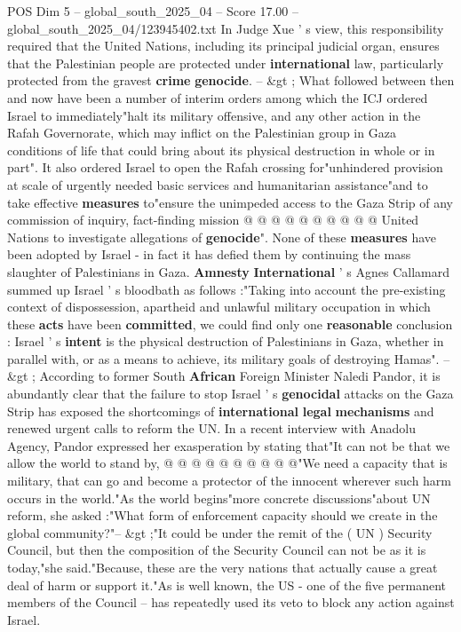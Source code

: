 \begin{textsample}{POS Dim 5 – global\_south\_2025\_04 – Score 17.00 – global\_south\_2025\_04/123945402.txt}
In Judge Xue ' s view, this responsibility required that the United Nations, including its principal judicial organ, ensures that the Palestinian people are protected under \textbf{international} law, particularly protected from the gravest \textbf{crime} \textbf{genocide}. -- \&gt ; What followed between then and now have been a number of interim orders among which the ICJ ordered Israel to immediately"halt its military offensive, and any other action in the Rafah Governorate, which may inflict on the Palestinian group in Gaza conditions of life that could bring about its physical destruction in whole or in part".
It also ordered Israel to open the Rafah crossing for"unhindered provision at scale of urgently needed basic services and humanitarian assistance"and to take effective \textbf{measures} to"ensure the unimpeded access to the Gaza Strip of any commission of inquiry, fact-finding mission @ @ @ @ @ @ @ @ @ @ United Nations to investigate allegations of \textbf{genocide}".
None of these \textbf{measures} have been adopted by Israel - in fact it has defied them by continuing the mass slaughter of Palestinians in Gaza. \textbf{Amnesty} \textbf{International} ' s Agnes Callamard summed up Israel ' s bloodbath as follows :"Taking into account the pre-existing context of dispossession, apartheid and unlawful military occupation in which these \textbf{acts} have been \textbf{committed}, we could find only one \textbf{reasonable} conclusion : Israel ' s \textbf{intent} is the physical destruction of Palestinians in Gaza, whether in parallel with, or as a means to achieve, its military goals of destroying Hamas". -- \&gt ; According to former South \textbf{African} Foreign Minister Naledi Pandor, it is abundantly clear that the failure to stop Israel ' s \textbf{genocidal} attacks on the Gaza Strip has exposed the shortcomings of \textbf{international} \textbf{legal} \textbf{mechanisms} and renewed urgent calls to reform the UN.
In a recent interview with Anadolu Agency, Pandor expressed her exasperation by stating that"It can not be that we allow the world to stand by, @ @ @ @ @ @ @ @ @ @"We need a capacity that is military, that can go and become a protector of the innocent wherever such harm occurs in the world."As the world begins"more concrete discussions"about UN reform, she asked :"What form of enforcement capacity should we create in the global community?"-- \&gt ;"It could be under the remit of the ( UN ) Security Council, but then the composition of the Security Council can not be as it is today,"she said."Because, these are the very nations that actually cause a great deal of harm or support it."As is well known, the US - one of the five permanent members of the Council -- has repeatedly used its veto to block any action against Israel.

\end{textsample}
